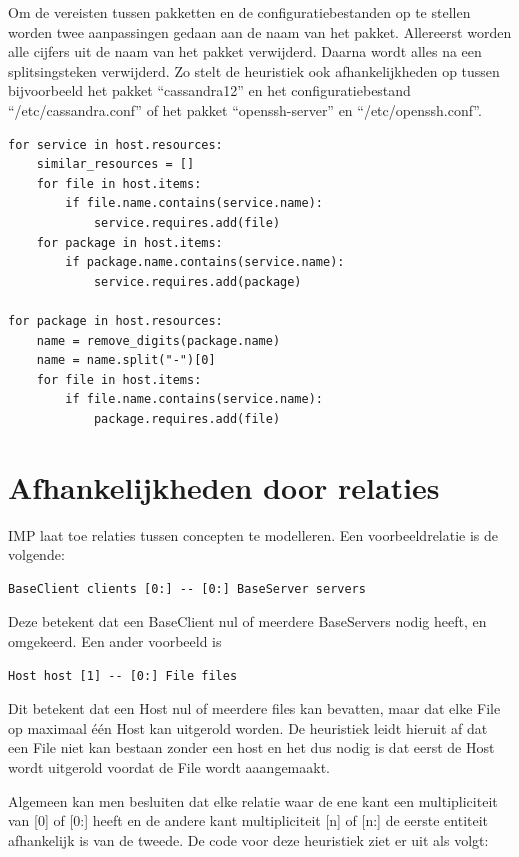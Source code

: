 Om de vereisten tussen pakketten en de configuratiebestanden op te stellen worden twee aanpassingen gedaan aan de naam van het pakket.
Allereerst worden alle cijfers uit de naam van het pakket verwijderd.
Daarna wordt alles na een splitsingsteken verwijderd.
Zo stelt de heuristiek ook afhankelijkheden op tussen bijvoorbeeld het pakket ``cassandra12'' en het configuratiebestand ``/etc/cassandra.conf'' of het pakket ``openssh-server'' en ``/etc/openssh.conf''. 
\begin{minipage}{\textwidth}
\begin{lstlisting}
for service in host.resources:
    similar_resources = []
    for file in host.items:
        if file.name.contains(service.name):
            service.requires.add(file)
    for package in host.items:
        if package.name.contains(service.name):
            service.requires.add(package)

for package in host.resources:
    name = remove_digits(package.name)
    name = name.split("-")[0]
    for file in host.items:
        if file.name.contains(service.name):
            package.requires.add(file)
\end{lstlisting}
\end{minipage}

\section{Afhankelijkheden door relaties}
\label{sec:relaties}
IMP laat toe relaties tussen concepten te modelleren.
Een voorbeeldrelatie is de volgende:
\begin{lstlisting}
BaseClient clients [0:] -- [0:] BaseServer servers
\end{lstlisting}
Deze betekent dat een BaseClient nul of meerdere BaseServers nodig heeft, en omgekeerd.
Een ander voorbeeld is 
\begin{lstlisting}
Host host [1] -- [0:] File files
\end{lstlisting}
Dit betekent dat een Host nul of meerdere files kan bevatten, maar dat elke File op maximaal \'e\'en Host kan uitgerold worden.
De heuristiek leidt hieruit af dat een File niet kan bestaan zonder een host en het dus nodig is dat eerst de Host wordt uitgerold voordat de File wordt aaangemaakt.

Algemeen kan men besluiten dat elke relatie waar de ene kant een multipliciteit van [0] of [0:] heeft en de andere kant multipliciteit [n] of [n:] de eerste entiteit afhankelijk is van de tweede.
De code voor deze heuristiek ziet er uit als volgt:

